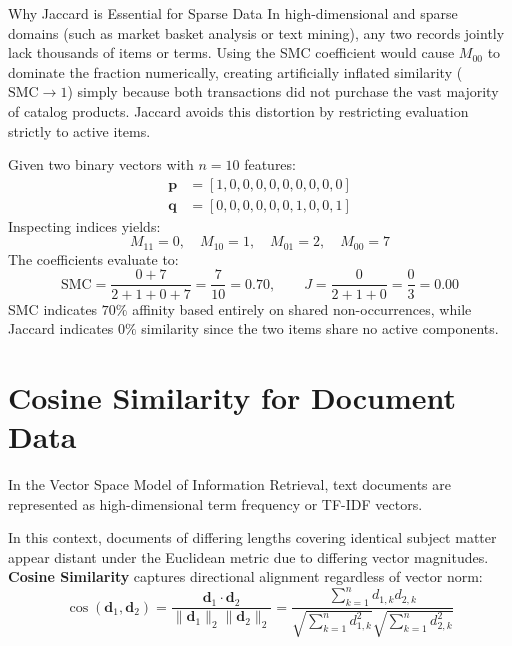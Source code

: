 \begin{noteblock}{Why Jaccard is Essential for Sparse Data}
In high-dimensional and sparse domains (such as market basket analysis or text mining), any two records jointly lack thousands of items or terms. Using the SMC coefficient would cause $M_{00}$ to dominate the fraction numerically, creating artificially inflated similarity ($\text{SMC} \to 1$) simply because both transactions did not purchase the vast majority of catalog products. Jaccard avoids this distortion by restricting evaluation strictly to active items.
\end{noteblock}

\begin{example}
Given two binary vectors with $n = 10$ features:
\begin{align}
    \mathbf{p} &= [1, 0, 0, 0, 0, 0, 0, 0, 0, 0] \\
    \mathbf{q} &= [0, 0, 0, 0, 0, 0, 1, 0, 0, 1]
\end{align}
Inspecting indices yields:
\begin{equation}
    M_{11} = 0, \quad M_{10} = 1, \quad M_{01} = 2, \quad M_{00} = 7
\end{equation}
The coefficients evaluate to:
\begin{equation}
    \text{SMC} = \frac{0 + 7}{2 + 1 + 0 + 7} = \frac{7}{10} = 0.70, \qquad
    J = \frac{0}{2 + 1 + 0} = \frac{0}{3} = 0.00
\end{equation}
SMC indicates $70\%$ affinity based entirely on shared non-occurrences, while Jaccard indicates $0\%$ similarity since the two items share no active components.
\end{example}

\section{Cosine Similarity for Document Data}
\label{sec:dm-cosine-similarity}

In the Vector Space Model of Information Retrieval, text documents are represented as high-dimensional term frequency or TF-IDF vectors.

In this context, documents of differing lengths covering identical subject matter appear distant under the Euclidean metric due to differing vector magnitudes. \textbf{Cosine Similarity} captures directional alignment regardless of vector norm:
\begin{equation}
    \cos(\mathbf{d}_1, \mathbf{d}_2) = \frac{\mathbf{d}_1 \cdot \mathbf{d}_2}{\|\mathbf{d}_1\|_2 \|\mathbf{d}_2\|_2} = \frac{\sum_{k=1}^n d_{1,k} d_{2,k}}{\sqrt{\sum_{k=1}^n d_{1,k}^2} \sqrt{\sum_{k=1}^n d_{2,k}^2}}
    \label{eq:dm-cosine}
\end{equation}

